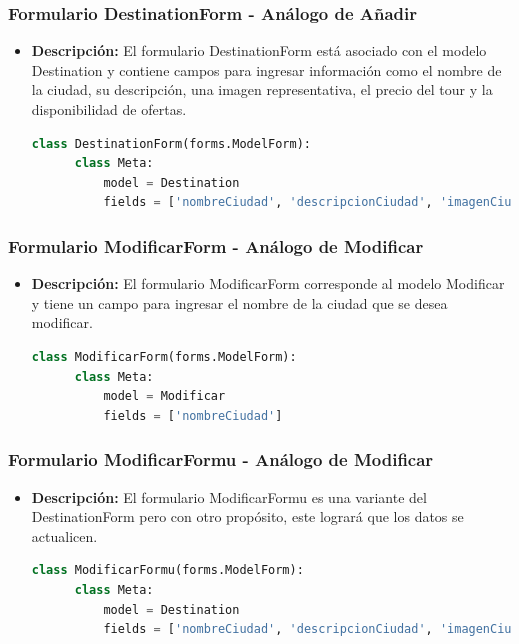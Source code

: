 \documentclass{article}
\begin{document}
  \subsubsection{Formulario DestinationForm - Análogo de Añadir}
  \begin{itemize}
    \item \textbf{Descripción: }El formulario DestinationForm está asociado con el modelo Destination y contiene campos para 
    ingresar información como el nombre de la ciudad, su descripción, una imagen representativa, el precio del tour y la disponibilidad de ofertas.
    \begin{lstlisting}[language=Python, caption={Formulario Añadir}]
    class DestinationForm(forms.ModelForm):
      class Meta:
          model = Destination
          fields = ['nombreCiudad', 'descripcionCiudad', 'imagenCiudad', 'precioTour', 'ofertaTour']
    \end{lstlisting}
  \end{itemize}
  \newpage
  

  \subsubsection{Formulario ModificarForm - Análogo de Modificar}
  \begin{itemize}
    \item \textbf{Descripción: }El formulario ModificarForm corresponde al modelo Modificar y tiene un campo para ingresar el 
    nombre de la ciudad que se desea modificar.
    \begin{lstlisting}[language=Python, caption={Formulario Modificar}]
    class ModificarForm(forms.ModelForm):
      class Meta:
          model = Modificar
          fields = ['nombreCiudad']
    \end{lstlisting}
  \end{itemize}
  

  \subsubsection{Formulario ModificarFormu - Análogo de Modificar}
  \begin{itemize}
    \item \textbf{Descripción: }El formulario ModificarFormu es una variante del DestinationForm pero con otro propósito, este logrará que los datos
     se actualicen.
    \begin{lstlisting}[language=Python, caption={Formulario Modificar}]
    class ModificarFormu(forms.ModelForm):
      class Meta:
          model = Destination
          fields = ['nombreCiudad', 'descripcionCiudad', 'imagenCiudad', 'precioTour', 'ofertaTour']
    \end{lstlisting}
  \end{itemize}
  
\end{document}
